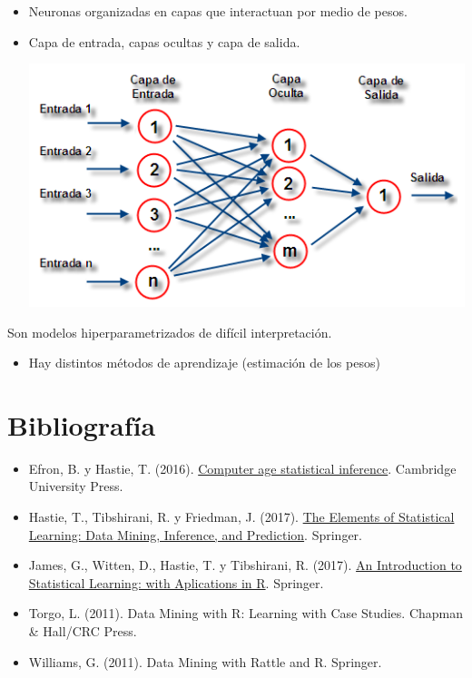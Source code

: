 \documentclass[]{book}
\providecommand{\tightlist}{%
  \setlength{\itemsep}{0pt}\setlength{\parskip}{0pt}}
\begin{document}
\begin{itemize}
\item
  Neuronas organizadas en capas que interactuan por medio de pesos.
\item
  Capa de entrada, capas ocultas y capa de salida.

  \includegraphics[width=6.88in]{images/nn}
\end{itemize}

Son modelos hiperparametrizados de difícil interpretación.

\begin{itemize}
\tightlist
\item
  Hay distintos métodos de aprendizaje (estimación de los pesos)
\end{itemize}

\section{Bibliografía}\label{bibliografuxeda}

\begin{itemize}
\item
  Efron, B. y Hastie, T. (2016).
  \href{http://web.stanford.edu/~hastie/CASI/}{Computer age statistical
  inference}. Cambridge University Press.
\item
  Hastie, T., Tibshirani, R. y Friedman, J. (2017).
  \href{https://web.stanford.edu/~hastie/ElemStatLearn}{The Elements of
  Statistical Learning: Data Mining, Inference, and Prediction}.
  Springer.
\item
  James, G., Witten, D., Hastie, T. y Tibshirani, R. (2017).
  \href{http://faculty.marshall.usc.edu/gareth-james/ISL}{An
  Introduction to Statistical Learning: with Aplications in R}.
  Springer.
\item
  Torgo, L. (2011). Data Mining with R: Learning with Case Studies.
  Chapman \& Hall/CRC Press.
\item
  Williams, G. (2011). Data Mining with Rattle and R. Springer.
\end{itemize}


\end{document}
